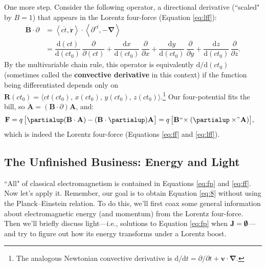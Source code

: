 \documentclass[12pt]{article}
\renewcommand{\vv}[1]{\mathbf{#1}}
\newcommand{\dd}[1]{\mathrm{d}#1}
\newcommand{\del}{\boldsymbol{\nabla}}
\begin{document}
One more step. Consider the following operator, a directional derivative (``scaled" by $B = 1$) that appears in the Lorentz four-force (Equation \ref{eq:lff}):
\begin{equation*}
\begin{split}
\vv B \cdot \partialup &= \left \langle c \mathring{t}, \mathring{\vv r} \right \rangle \cdot \left \langle \partial^{ct}, - \del \right \rangle \\[4pt]
&= \dfrac{\dd (ct)}{\dd (ct_0)} \, \dfrac{\partial}{\partial (ct)} + \dfrac{\dd x}{\dd (ct_0)} \, \dfrac{\partial}{\partial x} +  \dfrac{\dd y}{\dd (ct_0)} \, \dfrac{\partial}{\partial y} + \dfrac{\dd z}{\dd (ct_0)} \, \dfrac{\partial}{\partial z} .
\end{split}
\end{equation*}
By the multivariable chain rule, this operator is equivalently $\dd / \dd (ct_0)$ (sometimes called the \textbf{convective derivative} in this context) if the function being differentiated depends only on ${\vv R (ct_0) = \langle ct (ct_0), \, x (ct_0), \, y (ct_0), \, z (ct_0) \rangle}$.\footnote{The analogous Newtonian convective derivative is $\dd / \dd t = \partial / \partial t + \vv v \cdot \del$.} Our four-potential fits the bill, so $\mathring{\vv A} = (\vv B \cdot \partialup) \vv A $, and:
\begin{equation*}
\begin{split}
\vv F &= q \, \bigl[ \partialup (\vv B \cdot \vv A) - (\vv B \cdot \partialup) \vv A \bigr] = q \, \bigl[ \vv B \mkern1mu `` \mkern-4mu \times (\partialup \times \mkern-4mu " \mkern1mu \vv A) \bigr] ,
\end{split}
\end{equation*}
which is indeed the Lorentz four-force (Equations \ref{eq:ff} and \ref{eq:lff}).

\subsection{The Unfinished Business: Energy and Light}

``All" of classical electromagnetism is contained in Equations \ref{eq:fp} and \ref{eq:ff}. Now let's apply it. Remember, our goal is to obtain Equation \ref{eq:8} without using the Planck--Einstein relation. To do this, we'll first coax some general information about electromagnetic energy (and momentum) from the Lorentz four-force. Then we'll briefly discuss light---i.e., solutions to Equation \ref{eq:fp} when $\vv J = \textrm{\mbox{\boldmath $\emptyset$}}$---and try to figure out how its energy transforms under a Lorentz boost.
\end{document}
